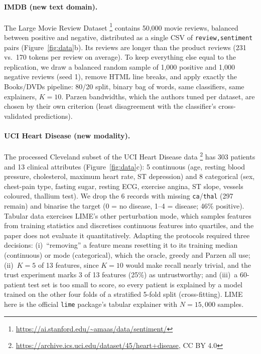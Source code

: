 \documentclass[11pt]{article}
\begin{document}
\paragraph{IMDB (new text domain).} The Large Movie Review Dataset \citep{maas2011}\footnote{\url{https://ai.stanford.edu/~amaas/data/sentiment/}} contains 50,000 movie reviews, balanced between positive and negative, distributed as a single CSV of \texttt{review,sentiment} pairs (Figure~\ref{fig:data}b). Its reviews are longer than the product reviews (231 vs.\ 170 tokens per review on average). To keep everything else equal to the replication, we draw a balanced random sample of 1,000 positive and 1,000 negative reviews (seed 1), remove HTML line breaks, and apply exactly the Books/DVDs pipeline: 80/20 split, binary bag of words, same classifiers, same explainers, $K{=}10$. Parzen bandwidths, which the authors tuned per dataset, are chosen by their own criterion (least disagreement with the classifier's cross-validated predictions).

\paragraph{UCI Heart Disease (new modality).} The processed Cleveland subset of the UCI Heart Disease data \citep{janosi1988,detrano1989}\footnote{\url{https://archive.ics.uci.edu/dataset/45/heart+disease}, CC BY 4.0} has 303 patients and 13 clinical attributes (Figure~\ref{fig:data}c): 5 continuous (age, resting blood pressure, cholesterol, maximum heart rate, ST depression) and 8 categorical (sex, chest-pain type, fasting sugar, resting ECG, exercise angina, ST slope, vessels coloured, thallium test). We drop the 6 records with missing \texttt{ca}/\texttt{thal} (297 remain) and binarise the target (0 = no disease, 1--4 = disease; 46\% positive). Tabular data exercises LIME's other perturbation mode, which samples features from training statistics and discretises continuous features into quartiles, and the paper does not evaluate it quantitatively. Adapting the protocols required three decisions: (i)~``removing'' a feature means resetting it to its training median (continuous) or mode (categorical), which the oracle, greedy and Parzen all use; (ii)~$K{=}5$ of 13 features, since $K{=}10$ would make recall nearly trivial, and the trust experiment marks 3 of 13 features (25\%) as untrustworthy; and (iii)~a 60-patient test set is too small to score, so every patient is explained by a model trained on the other four folds of a stratified 5-fold split (cross-fitting). LIME here is the official \texttt{lime} package's tabular explainer with $N{=}15{,}000$ samples.
\end{document}
